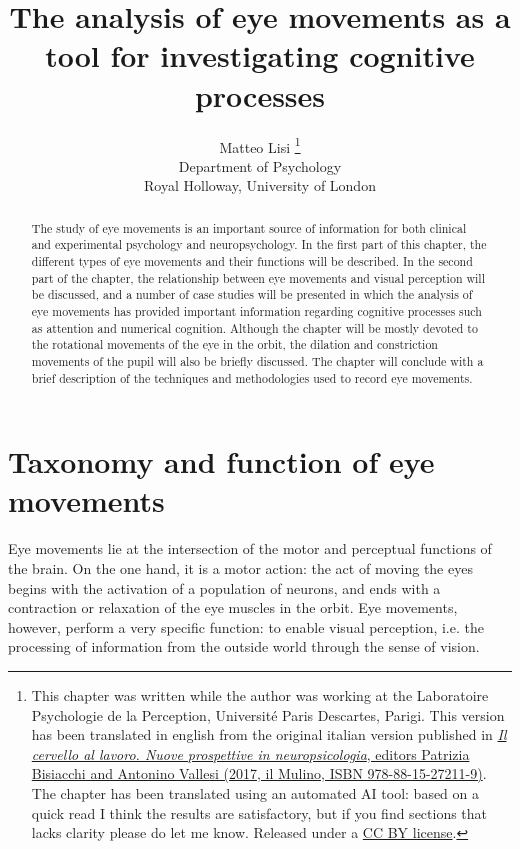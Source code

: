 \documentclass[11pt]{article}
\title{The analysis of eye movements as a tool for investigating cognitive processes}
\author{
        Matteo Lisi \footnote{\scriptsize{This chapter was written while the author was working at the Laboratoire Psychologie de la Perception, Université Paris Descartes, Parigi. This version has been translated in english from the original italian version published in \href{https://www.mulino.it/isbn/9788815272119}{\textit{Il cervello al lavoro. Nuove prospettive in neuropsicologia}, editors Patrizia Bisiacchi and Antonino Vallesi (2017, il Mulino, ISBN 978-88-15-27211-9)}. The chapter has been translated using an automated AI tool: based on a quick read I think the results are satisfactory, but if you find sections that lacks clarity please do let me know. Released under a \href{https://creativecommons.org/licenses/by/2.0/}{CC BY license}.}} \\
        \small{Department of Psychology}\\
        \small{Royal Holloway, University of London}
}
\date{}
\begin{document}
\sloppy
\maketitle

\begin{abstract}
The study of eye movements is an important source of information for both clinical and experimental psychology and neuropsychology. In the first part of this chapter, the different types of eye movements and their functions will be described. In the second part of the chapter, the relationship between eye movements and visual perception will be discussed, and a number of case studies will be presented in which the analysis of eye movements has provided important information regarding cognitive processes such as attention and numerical cognition. Although the chapter will be mostly devoted to the rotational movements of the eye in the orbit, the dilation and constriction movements of the pupil will also be briefly discussed. The chapter will conclude with a brief description of the techniques and methodologies used to record eye movements.
\end{abstract}

\section{Taxonomy and function of eye movements}
Eye movements lie at the intersection of the motor and perceptual functions of the brain. On the one hand, it is a motor action: the act of moving the eyes begins with the activation of a population of neurons, and ends with a contraction or relaxation of the eye muscles in the orbit. Eye movements, however, perform a very specific function: to enable visual perception, i.e. the processing of information from the outside world through the sense of vision.
\end{document}

